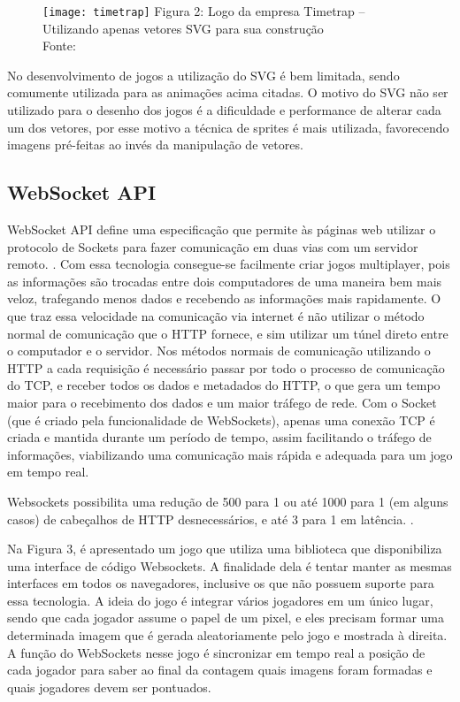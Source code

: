 \begin{figure}[H]
  \centering
	\texttt{[image: timetrap]}
	\footnotesize\hspace{8\baselineskip}
	Figura 2: Logo da empresa Timetrap {--} Utilizando apenas vetores SVG para sua construção \\
	Fonte: 
  \label{img:timetrap}
\end{figure}

No desenvolvimento de jogos a utilização do SVG é bem limitada, sendo
comumente utilizada para as animações acima citadas. O motivo do SVG
não ser utilizado para o desenho dos jogos é a dificuldade e
performance de alterar cada um dos vetores, por esse motivo
a técnica de sprites é mais utilizada, favorecendo imagens pré-feitas
ao invés da manipulação de vetores.


\subsection{WebSocket API}

WebSocket API define uma especificação que permite às páginas web
utilizar o protocolo de Sockets para fazer comunicação em duas
vias com um servidor remoto. \cite{website:w3cwebsockets}. Com essa tecnologia
consegue-se facilmente criar jogos multiplayer, pois as informações
são trocadas entre dois computadores de uma maneira bem mais
veloz, trafegando menos dados e recebendo as informações mais
rapidamente.
O que traz essa velocidade na comunicação via internet é não utilizar
o método normal de comunicação que o HTTP fornece, e sim utilizar um
túnel direto entre o computador e o servidor.
Nos métodos normais de comunicação utilizando o HTTP a cada requisição
é necessário passar por todo o processo de comunicação do TCP, e
receber todos os dados e metadados do HTTP, o que gera um tempo maior para
o recebimento dos dados e um maior tráfego de rede. Com o Socket (que
é criado pela funcionalidade de WebSockets), apenas uma conexão TCP é
criada e mantida durante um período de tempo, assim facilitando o
tráfego de informações, viabilizando uma comunicação mais rápida e
adequada para um jogo em tempo real.

Websockets possibilita uma redução de 500 para 1 ou até 1000 para 1
(em alguns casos) de cabeçalhos de HTTP desnecessários, e até 3 para 1
em latência. \cite{lubbers2010pro}.

Na Figura 3, é apresentado um jogo que utiliza
uma biblioteca que disponibiliza uma interface de código Websockets.
A finalidade dela é tentar manter as mesmas interfaces em
todos os navegadores, inclusive os que não possuem suporte para essa
tecnologia. A ideia do jogo é integrar vários jogadores em um único lugar, sendo que
cada jogador assume o papel de um pixel, e eles precisam formar uma
determinada imagem que é gerada aleatoriamente pelo jogo e mostrada à
direita. A função do WebSockets nesse jogo é sincronizar em tempo real a
posição de cada jogador para saber ao final da contagem quais imagens
foram formadas e quais jogadores devem ser pontuados.

